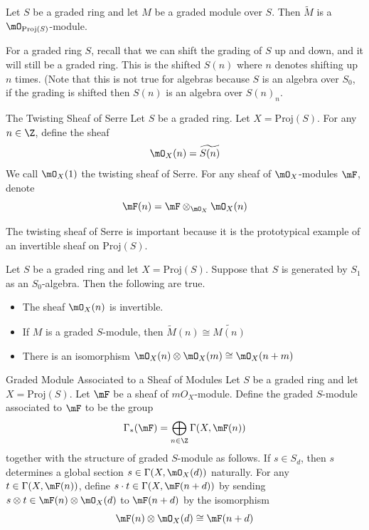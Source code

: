\documentclass[a4paper]{article}
\begin{document}
\begin{lmm}{}{} Let $S$ be a graded ring and let $M$ be a graded module over $S$. Then $\widetilde{M}$ is a $\mO_{\text{Proj}(S)}$-module. 
\end{lmm}

For a graded ring $S$, recall that we can shift the grading of $S$ up and down, and it will still be a graded ring. This is the shifted $S(n)$ where $n$ denotes shifting up $n$ times. (Note that this is not true for algebras because $S$ is an algebra over $S_0$, if the grading is shifted then $S(n)$ is an algebra over $S(n)_n$. 

\begin{defn}{The Twisting Sheaf of Serre}{} Let $S$ be a graded ring. Let $X=\text{Proj}(S)$. For any $n\in\Z$, define the sheaf $$\mO_X(n)=\widetilde{S(n)}$$ We call $\mO_X(1)$ the twisting sheaf of Serre. For any sheaf of $\mO_X$-modules $\mF$, denote $$\mF(n)=\mF\otimes_{\mO_X}\mO_X(n)$$
\end{defn}

The twisting sheaf of Serre is important because it is the prototypical example of an invertible sheaf on $\text{Proj}(S)$. 

\begin{prp}{}{} Let $S$ be a graded ring and let $X=\text{Proj}(S)$. Suppose that $S$ is generated by $S_1$ as an $S_0$-algebra. Then the following are true. 
\begin{itemize}
\item The sheaf $\mO_X(n)$ is invertible. 
\item If $M$ is a graded $S$-module, then $\widetilde{M}(n)\cong\widetilde{M(n)}$
\item There is an isomorphism $\mO_X(n)\otimes\mO_X(m)\cong\mO_X(n+m)$
\end{itemize}
\end{prp}

\begin{defn}{Graded Module Associated to a Sheaf of Modules}{} Let $S$ be a graded ring and let $X=\text{Proj}(S)$. Let $\mF$ be a sheaf of $mO_X$-module. Define the graded $S$-module associated to $\mF$ to be the group $$\Gamma_\ast(\mF)=\bigoplus_{n\in\Z}\Gamma(X,\mF(n))$$ together with the structure of graded $S$-module as follows. If $s\in S_d$, then $s$ determines a global section $s\in\Gamma(X,\mO_X(d))$ naturally. For any $t\in\Gamma(X,\mF(n))$, define $s\cdot t\in\Gamma(X,\mF(n+d))$ by sending $s\otimes t\in\mF(n)\otimes\mO_X(d)$ to $\mF(n+d)$ by the isomorphism $$\mF(n)\otimes\mO_X(d)\cong\mF(n+d)$$
\end{defn}
\end{document}
